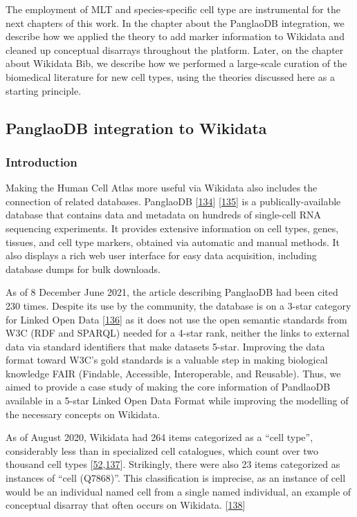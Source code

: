 The employment of MLT and species-specific cell type are instrumental for the next chapters of this work.
In the chapter about the PanglaoDB integration, we describe how we applied the theory to add marker information to Wikidata and cleaned up conceptual disarrays throughout the platform.
Later, on the chapter about Wikidata Bib, we describe how we performed a large-scale curation of the biomedical literature for new cell types, using the theories discussed here as a starting principle.

\hypertarget{panglaodb-integration-to-wikidata}{%
\subsection{PanglaoDB integration to Wikidata}\label{panglaodb-integration-to-wikidata}}

\hypertarget{introduction}{%
\subsubsection{Introduction}\label{introduction}}

Making the Human Cell Atlas more useful via Wikidata also includes the connection of related databases.
PanglaoDB {[}\protect\hyperlink{ref-M0lqRYJb}{134}{]} {[}\protect\hyperlink{ref-T3PlZ3Vh}{135}{]} is a publically-available database that contains data and metadata on hundreds of single-cell RNA sequencing experiments.
It provides extensive information on cell types, genes, tissues, and cell type markers, obtained via automatic and manual methods.
It also displays a rich web user interface for easy data acquisition, including database dumps for bulk downloads.

As of 8 December June 2021, the article describing PanglaoDB had been cited 230 times.
Despite its use by the community, the database is on a 3-star category for Linked Open Data {[}\protect\hyperlink{ref-OGXYtGZ8}{136}{]} as it does not use the open semantic standards from W3C (RDF and SPARQL) needed for a 4-star rank, neither the links to external data via standard identifiers that make datasets 5-star.
Improving the data format toward W3C's gold standards is a valuable step in making biological knowledge FAIR (Findable, Accessible, Interoperable, and Reusable).
Thus, we aimed to provide a case study of making the core information of PandlaoDB available in a 5-star Linked Open Data Format while improving the modelling of the necessary concepts on Wikidata.

As of August 2020, Wikidata had 264 items categorized as a ``cell type'', considerably less than in specialized cell catalogues, which count over two thousand cell types {[}\protect\hyperlink{ref-agnqfdk6}{52},\protect\hyperlink{ref-4AEy2xhQ}{137}{]}.
Strikingly, there were also 23 items categorized as instances of ``cell (Q7868)''.
This classification is imprecise, as an instance of cell would be an individual named cell from a single named individual, an example of conceptual disarray that often occurs on Wikidata. {[}\protect\hyperlink{ref-imSZTi52}{138}{]}

